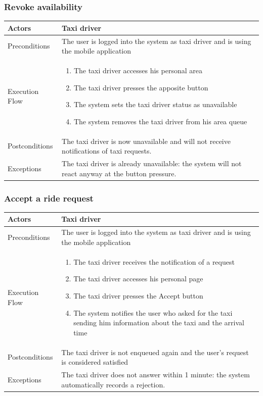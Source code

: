 		\subsubsection{Revoke availability}
			\begin{center}
				\begin{tabular}{ | l | p{8cm} |}
					\hline Actors & Taxi driver
					\\ \hline
					Preconditions &
					The user is logged into the system as taxi driver and is using the mobile application
					\\ \hline
					Execution Flow &
					\begin{enumerate}
						\item The taxi driver accesses his personal area
						\item The taxi driver presses the apposite button
						\item The system sets the taxi driver status as unavailable
						\item The system removes the taxi driver from his area queue
					\end{enumerate}
					\\ \hline
					Postconditions & 
					The taxi driver is now unavailable and will not receive notifications of taxi requests.
					\\ \hline
					Exceptions &
					The taxi driver is already unavailable: the system will not react anyway at the button
					pressure.
					\\ \hline
				\end{tabular}
			\end{center}
		\subsubsection{Accept a ride request}
			\begin{center}
				\begin{tabular}{ | l | p{8cm} |}
					\hline Actors & Taxi driver
					\\ \hline
					Preconditions &
					The user is logged into the system as taxi driver and is using the mobile application
					\\ \hline
					Execution Flow &
					\begin{enumerate}
						\item The taxi driver receives the notification of a request
						\item The taxi driver accesses his personal page
						\item The taxi driver presses the Accept button
						\item The system notifies the user who asked for the taxi sending him
						information about the taxi and the arrival time
					\end{enumerate}
					\\ \hline
					Postconditions & The taxi driver is not enqueued again and the user's request
					is considered satisfied
					\\ \hline
					Exceptions &
					The taxi driver does not answer within 1 minute:
					the system automatically records a rejection.
					\\ \hline
				\end{tabular}
			\end{center}

